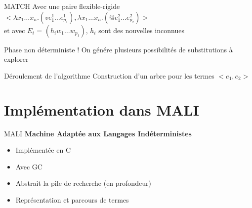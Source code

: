 \documentclass[aspectratio=169]{beamer}
\begin{document}
\begin{frame}{MATCH}
  Avec une paire flexible-rigide $<\lambda x_1 \ldots x_n . (v e_1^1 \ldots e_{p_1}^1), \lambda x_1 \ldots x_n . (@ e_1^2 \ldots e_{p_2}^2)>$\\
 et avec $E_i$ = $(h_i w_1 \ldots w_{p_1})$, $h_i$ sont des nouvelles inconnues
  \begin{algorithmic}
    \EndIf
    \EndFor
    \EndProcedure
  \end{algorithmic}

  Phase non déterministe ! On génére plusieurs possibilités de substitutions à explorer
\end{frame}

\begin{frame}{Déroulement de l'algorithme}
  Construction d'un arbre pour les termes $<e_1, e_2>$
  \begin{algorithmic}
    \EndWhile
    \EndProcedure
  \end{algorithmic}
\end{frame}

\section{Implémentation dans MALI}

\begin{frame}{MALI}
  \textbf{Machine Adaptée aux Langages Indéterministes}
  \begin{itemize}
    \item Implémentée en C
    \item Avec GC
    \item Abstrait la pile de recherche (en profondeur)
    \item Représentation et parcours de termes
  \end{itemize}
\end{frame}
\end{document}
